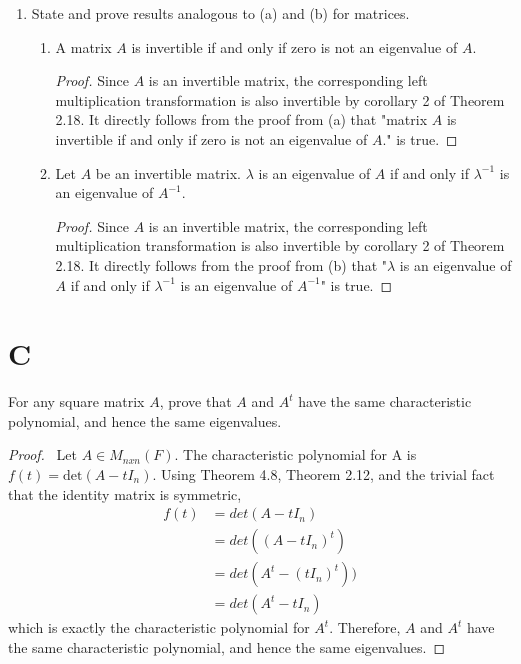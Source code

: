 \documentclass[11pt]{scrartcl}
\begin{document}
\begin{enumerate}[label=\alph*.]
{	      }
	\item{
	      State and prove results analogous to (a) and (b) for matrices.
	      \begin{enumerate}[label=(\alph*)]
		      \item{
		            A matrix $A$ is invertible if and only if zero is not an eigenvalue of $A$.
		            \begin{proof}
			            Since $A$ is an invertible matrix, the corresponding left multiplication transformation
			            is also invertible by corollary 2 of Theorem 2.18. It directly follows from the proof from (a)
			            that "matrix $A$ is invertible if and only if zero is not an eigenvalue of $A$."
			            is true.
		            \end{proof}
		            }
		      \item{
		            Let $A$ be an invertible matrix.
		            $\lambda$ is an eigenvalue of $A$ if and only if $\lambda^{-1}$ is an eigenvalue of $A^{-1}$.
		            \begin{proof}
			            Since $A$ is an invertible matrix, the corresponding left multiplication transformation
			            is also invertible by corollary 2 of Theorem 2.18. It directly follows from the proof from (b)
			            that "$\lambda$ is an eigenvalue of $A$ if and only if $\lambda^{-1}$ is an eigenvalue of $A^{-1}$"
			            is true.
		            \end{proof}
		            }
	      \end{enumerate}
	      }
\end{enumerate}

\section{C}
For any square matrix $A$, prove that $A$ and $A^t$ have the same characteristic polynomial, and hence the same
eigenvalues.
\begin{proof}\
	Let $A \in M_{nxn}(F)$. The characteristic polynomial for A is $f(t) = \text{det}(A - tI_n)$.
	Using Theorem 4.8, Theorem 2.12, and the trivial fact that the identity matrix is symmetric,
	\begin{align*}
		f(t) & = det(A - tI_n)        \\
		     & = det((A - tI_n)^t)    \\
		     & = det(A^t - (tI_n)^t)) \\
		     & = det(A^t - tI_n)
	\end{align*}
	which is exactly the characteristic polynomial for $A^t$. Therefore, $A$ and $A^t$ have the same characteristic polynomial, and hence the same
	eigenvalues.
\end{proof}
\end{document}
